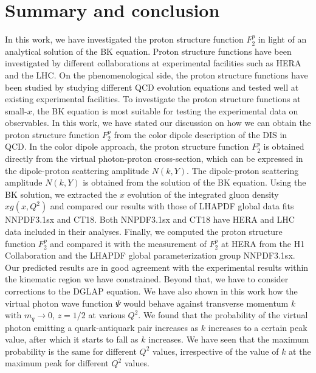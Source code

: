 \documentclass[12pt]{article}
\begin{document}
\section{Summary and conclusion}\label{sec:con}
In this work, we have investigated the proton structure function $F_2 ^p$ in light of an analytical solution of the BK equation. Proton structure functions have been investigated by different collaborations at experimental facilities such as HERA and the LHC. On the phenomenological side, the proton structure functions have been studied by studying different QCD evolution equations and tested well at existing experimental facilities. To investigate the proton structure functions at small-$x$, the BK equation is most suitable for testing the experimental data on observables. In this work, we have stated our discussion on how we can obtain the proton structure function $F_2 ^p$ from the color dipole description of the DIS in QCD. In the color dipole approach, the proton structure function $F_2 ^p$ is obtained directly from the virtual photon-proton cross-section, which can be expressed in the dipole-proton scattering amplitude $N(k,Y)$. The dipole-proton scattering amplitude $N(k,Y)$ is obtained from the solution of the BK equation. Using the BK solution, we extracted the $x$ evolution of the integrated gluon density $xg(x,Q^2)$ and compared our results with those of LHAPDF global data fits NNPDF3.1sx and CT18. Both NNPDF3.1sx and CT18 have HERA and LHC data included in their analyses. Finally, we computed the proton structure function $F_2 ^p$ and compared it with the measurement of $F_2 ^p$ at HERA from the H1 Collaboration and the LHAPDF global parameterization group NNPDF3.1sx. Our predicted results are in good agreement with the experimental results within the kinematic region we have constrained. Beyond that, we have to consider corrections to the DGLAP equation. We have also shown in this work how the virtual photon wave function $\Psi$ would behave against transverse momentum $k$ with $m_q \to 0$, $z=1/2$ at various $Q^2$. We found that the probability of the virtual photon emitting a quark-antiquark pair increases as $k$ increases to a certain peak value, after which it starts to fall as $k$ increases. We have seen that the maximum probability is the same for different $Q^2$ values, irrespective of the value of $k$ at the maximum peak for different $Q^2$ values.
\end{document}
